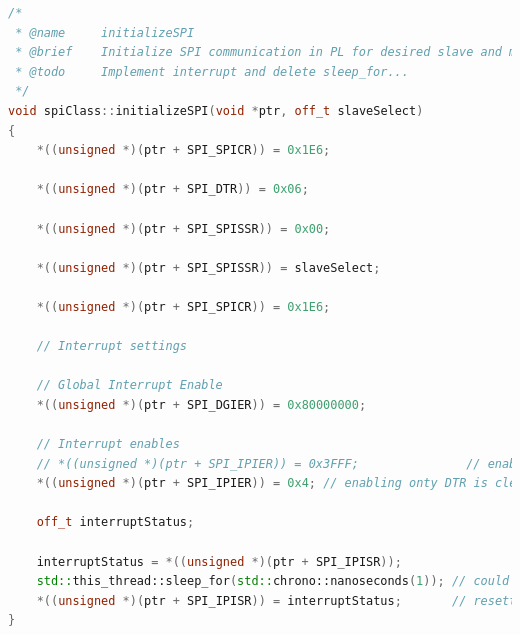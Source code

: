 \documentclass[a4paper, twoside, 11pt]{article}
\newcommand{\fbar}{\FloatBarrier}
\begin{document}
\begin{lstlisting}[language={c++}, caption={Algoritmus inicializace \gls{abbreviation:axi} Quad \gls{abbreviation:spi} jednotky v~C++.}, label={lst:initialize-spi}]
/*
 * @name     initializeSPI
 * @brief    Initialize SPI communication in PL for desired slave and mapped device.
 * @todo     Implement interrupt and delete sleep_for...
 */
void spiClass::initializeSPI(void *ptr, off_t slaveSelect)
{
    *((unsigned *)(ptr + SPI_SPICR)) = 0x1E6;

    *((unsigned *)(ptr + SPI_DTR)) = 0x06;

    *((unsigned *)(ptr + SPI_SPISSR)) = 0x00;

    *((unsigned *)(ptr + SPI_SPISSR)) = slaveSelect;

    *((unsigned *)(ptr + SPI_SPICR)) = 0x1E6;

    // Interrupt settings

    // Global Interrupt Enable
    *((unsigned *)(ptr + SPI_DGIER)) = 0x80000000;

    // Interrupt enables
    // *((unsigned *)(ptr + SPI_IPIER)) = 0x3FFF;               // enabling all interrupts
    *((unsigned *)(ptr + SPI_IPIER)) = 0x4; // enabling onty DTR is clear INT

    off_t interruptStatus;

    interruptStatus = *((unsigned *)(ptr + SPI_IPISR));
    std::this_thread::sleep_for(std::chrono::nanoseconds(1)); // could not resolve other way now, because reading and writing to register takes more time that one tick probably
    *((unsigned *)(ptr + SPI_IPISR)) = interruptStatus;       // resetting SPI interrupt status register
}
		\end{lstlisting}

	\fbar
\end{document}
